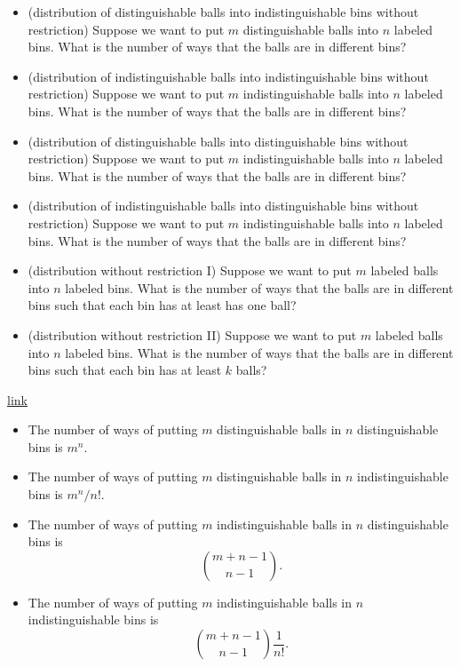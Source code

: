 \begin{refsection}
\begin{definition}
\begin{itemize}
	\item (distribution of distinguishable balls into indistinguishable bins without restriction) Suppose we want to put $m$ distinguishable balls into $n$ labeled bins. What is the number of   ways that the balls are in different bins?
	\item (distribution of indistinguishable balls into indistinguishable bins without restriction) Suppose we want to put $m$ indistinguishable balls into $n$ labeled bins. What is the number of   ways that the balls are in different bins?
	\item (distribution of distinguishable balls into distinguishable bins without restriction) Suppose we want to put $m$ indistinguishable balls into $n$ labeled bins. What is the number of   ways that the balls are in different bins?
	\item (distribution of indistinguishable balls into distinguishable bins without restriction) Suppose we want to put $m$ indistinguishable balls into $n$ labeled bins. What is the number of   ways that the balls are in different bins?
	
	\item (distribution without restriction I) Suppose we want to put $m$ labeled balls into $n$ labeled bins. What is the number of   ways that the balls are in different bins such that each bin has at least has one ball?
	\item (distribution without restriction II) Suppose we want to put $m$ labeled balls into $n$ labeled bins. What is the number of   ways that the balls are in different bins such that each bin has at least $k$ balls?
\end{itemize}	
 	
\end{definition}


\begin{lemma}\href{https://math.stackexchange.com/questions/26528/m-balls-n-boxes-probability-problem?noredirect=1&lq=1}{link}
\begin{itemize}
	\item The number of ways of putting $m$ distinguishable balls in $n$ distinguishable bins is $m^n$.
	\item The number of ways of putting $m$ distinguishable balls in $n$ indistinguishable bins is $m^n/n!$.
	\item The number of ways of putting $m$ indistinguishable balls in $n$ distinguishable bins is 
	$$\binom{m+n-1}{n-1}.$$
	\item The number of ways of putting $m$ indistinguishable balls in $n$ indistinguishable bins is 
	$$\binom{m+n-1}{n-1}\frac{1}{n!}.$$
	

\end{itemize}
\end{lemma}
\end{refsection}
